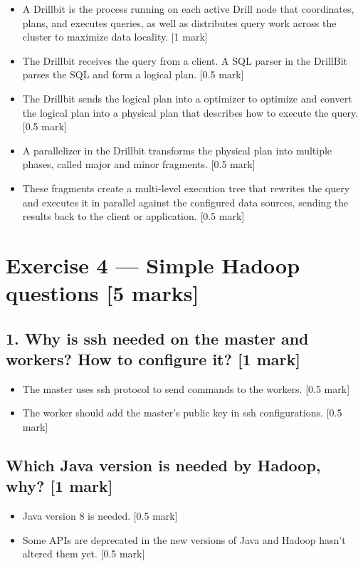 \documentclass[11pt,a4paper]{article}
\begin{document}
\begin{itemize}
\item A Drillbit is the process running on each active Drill node that coordinates, plans, and executes queries, as well as distributes query work across the cluster to maximize data locality. [1 mark]
\item The Drillbit receives the query from a client. A SQL parser in the DrillBit parses the SQL and form a logical plan. [0.5 mark]
\item The Drillbit sends the logical plan into a optimizer to optimize and convert the logical plan into a physical plan that describes how to execute the query. [0.5 mark]
\item A parallelizer in the Drillbit transforms the physical plan into multiple phases, called major and minor fragments.  [0.5 mark]
\item These fragments create a multi-level execution tree that rewrites the query and executes it in parallel against the configured data sources, sending the results back to the client or application. [0.5 mark]
\end{itemize}

\section*{Exercise 4 --- Simple Hadoop questions [5 marks]}

\subsection*{1. Why is ssh needed on the master and workers? How to configure it? [1 mark]}
\begin{itemize}
\item The master uses ssh protocol to send commands to the workers. [0.5 mark]
\item The worker should add the master's public key in ssh configurations. [0.5 mark]
\end{itemize}

\subsection*{Which Java version is needed by Hadoop, why? [1 mark]}
\begin{itemize}
\item Java version 8 is needed. [0.5 mark]
\item Some APIs are deprecated in the new versions of Java and Hadoop hasn't altered them yet. [0.5 mark]
\end{itemize}
\end{document}
